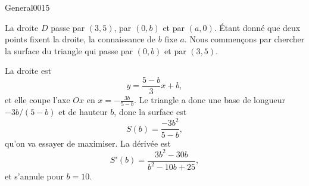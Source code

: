 \begin{corrige}{General0015}

La droite $D$ passe par $(3,5)$, par $(0,b)$ et par $(a,0)$. Étant donné que deux points fixent la droite, la connaissance de $b$ fixe $a$. Nous commençons par chercher la surface du triangle qui passe par $(0,b)$ et par $(3,5)$.

La droite est
\begin{equation}
	y=\frac{ 5-b }{ 3 }x+b,
\end{equation}
et elle coupe l'axe $Ox$ en $x=-\frac{ 3b }{ 5-b }$. Le triangle a donc une base de longueur $-3b/(5-b)$ et de hauteur $b$, donc la surface est
\begin{equation}
	S(b)=\frac{ -3b^2 }{ 5-b },
\end{equation}
qu'on va essayer de maximiser. La dérivée est
\begin{equation}
	S'(b)=\frac{ 3b^2-30b }{ b^2-10b+25 },
\end{equation}
et s'annule pour $b=10$.

\end{corrige}
